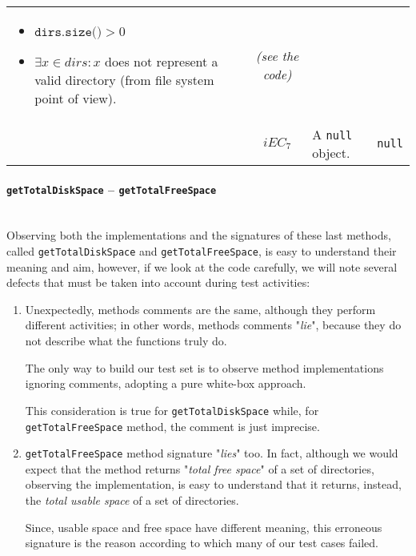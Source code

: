 \documentclass[sigconf]{acmart}
\begin{document}
\begin{table*}
\begin{tabular}{l|cm{10.5cm}|c}
    \begin{itemize}
	\item $\texttt{dirs.size()} > 0$
	\item $\exists x \in dirs : x $ does not represent a valid directory (from file system point of view).
	\end{itemize}
    
    & \textit{(see the code)}
    
	\\\cline{2-4}   
    & $iEC_7$ & A \texttt{null} object. & \texttt{null} \\     
    
    \bottomrule
  \end{tabular}
\end{table*}

\paragraph{\texttt{getTotalDiskSpace} -- \texttt{getTotalFreeSpace}}
\hfill\\
Observing both the implementations and the signatures of these last methods, called \texttt{getTotalDiskSpace} and \texttt{getTotalFreeSpace}, is easy to understand their meaning and aim, however, if we look at the code carefully, we will note several defects that must be taken into account during test activities:

\begin{enumerate}
\item Unexpectedly, methods comments are the same, although they perform different activities; in other words, methods comments "\textit{lie}", because they do not describe what the functions truly do. 

The only way to build our test set is to observe method implementations ignoring comments, adopting a pure white-box approach. 

This consideration is true for \texttt{getTotalDiskSpace} while, for \texttt{getTotalFreeSpace} method, the comment is just imprecise.\\

\item \texttt{getTotalFreeSpace} method signature "\textit{lies}" too. In fact, although we would expect that the method returns "\textit{total free space}" of a set of directories, observing the implementation, is easy to understand that it returns, instead, the \textit{total usable space} of a set of directories. 

Since, usable space and free space have different meaning, this erroneous signature is the reason according to which many of our test cases failed. 

\end{enumerate}
\end{document}
